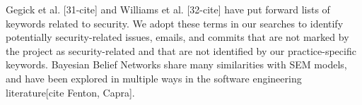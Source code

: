 Gegick et al. [31-cite] and Williams et al. [32-cite] have put forward lists of keywords related to security. We adopt these terms in our searches to identify potentially security-related issues, emails, and commits that are not marked by the project as security-related and that are not identified by our practice-specific keywords.
Bayesian Belief Networks share many similarities with SEM models, and have been explored in multiple ways in the software engineering literature[cite Fenton, Capra]. 


